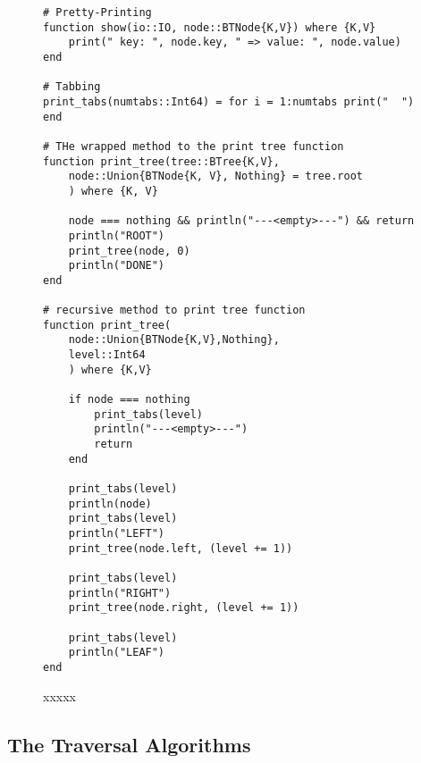 \documentclass[a4paper, 11pt]{article}
\begin{document}



    \begin{figure}[H]
        \centering
    \begin{verbatim}
# Pretty-Printing
function show(io::IO, node::BTNode{K,V}) where {K,V}
    print(" key: ", node.key, " => value: ", node.value)
end

# Tabbing
print_tabs(numtabs::Int64) = for i = 1:numtabs print("  ") end

# THe wrapped method to the print tree function
function print_tree(tree::BTree{K,V}, 
    node::Union{BTNode{K, V}, Nothing} = tree.root
    ) where {K, V}

    node === nothing && println("---<empty>---") && return
    println("ROOT")
    print_tree(node, 0)
    println("DONE")
end

# recursive method to print tree function
function print_tree(
    node::Union{BTNode{K,V},Nothing}, 
    level::Int64
    ) where {K,V}

    if node === nothing
        print_tabs(level)
        println("---<empty>---")
        return
    end

    print_tabs(level)
    println(node)
    print_tabs(level)
    println("LEFT")
    print_tree(node.left, (level += 1))

    print_tabs(level)
    println("RIGHT")
    print_tree(node.right, (level += 1))

    print_tabs(level)
    println("LEAF")
end
    \end{verbatim}
    \caption{xxxxx}
    \label{code:print}
    \end{figure}

    \subsection*{The Traversal Algorithms}
    \label{sec:treetraversal}
\end{document}
